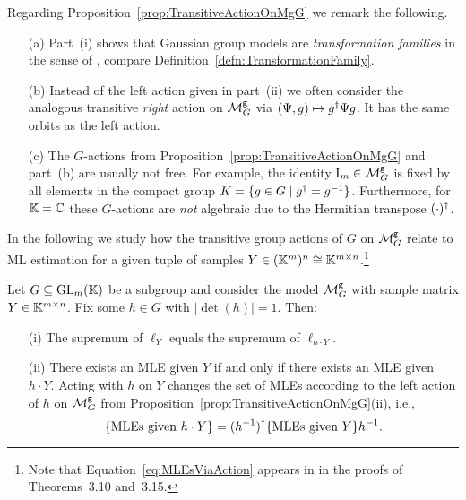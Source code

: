 \begin{remark}\label{rem:TransitiveActionOnMgG}
	Regarding Proposition~\ref{prop:TransitiveActionOnMgG} we remark the following.
	\begin{itemize}
		\item[(a)] Part~(i) shows that Gaussian group models are \emph{transformation families} in the sense of \cite{ExponentialTransformationModels}, compare Definition~\ref{defn:TransformationFamily}.
		
		\item[(b)] Instead of the left action given in part~(ii) we often consider the analogous transitive \emph{right} action on $\mathcal{M}^{\mathtt{g}}_G$ via $(\Psi, g) \mapsto g^{\dagger} \Psi g$. It has the same orbits as the left action.
		
		\item[(c)] The $G$-actions from Proposition~\ref{prop:TransitiveActionOnMgG} and part~(b) are usually not free. For example, the identity $\operatorname{I}_m \in \mathcal{M}^{\mathtt{g}}_G$ is fixed by all elements in the compact group $K = \{g \in G \mid g^{\dagger} = g^{-1}\}$. Furthermore, for $\mathbb K = \mathbb C$ these $G$-actions are \emph{not} algebraic due to the Hermitian transpose $(\cdot)^{\dagger}$.\hfill\remSymbol
	\end{itemize}
\end{remark}


In the following we study how the transitive group actions of $G$ on $\mathcal{M}^{\mathtt{g}}_G$ relate to ML estimation for a given tuple of samples $Y \in (\mathbb K^m)^n \cong \mathbb K^{m \times n}$.\footnote{Note that Equation~\eqref{eq:MLEsViaAction} appears in \cite{SiagaPaper} in the proofs of Theorems~3.10 and~3.15.}

\begin{prop}\label{prop:MLEsViaAction}
	Let $G \subseteq \operatorname{GL}_m(\mathbb K)$ be a subgroup and consider the model $\mathcal{M}^{\mathtt{g}}_G$ with sample matrix $Y \in \mathbb K^{m \times n}$. Fix some $h \in G$ with $|\det(h)|=1$. Then:
		\begin{itemize}
			\item[(i)] The supremum of $\ell_Y$ equals the supremum of $\ell_{h \cdot Y}$.
			\item[(ii)] There exists an MLE given $Y$ if and only if there exists an MLE given $h \cdot Y$. Acting with $h$ on $Y$ changes the set of MLEs according to the left action of $h$ on $\mathcal{M}^{\mathtt{g}}_G$ from Proposition~\ref{prop:TransitiveActionOnMgG}(ii), i.e.,
			\begin{equation}\label{eq:MLEsViaAction}
				\{ \text{MLEs given } h \cdot Y \} = (h^{-1})^{\dagger} \{ \text{MLEs given } Y \} h^{-1} .
			\end{equation}
		\end{itemize}
\end{prop}

